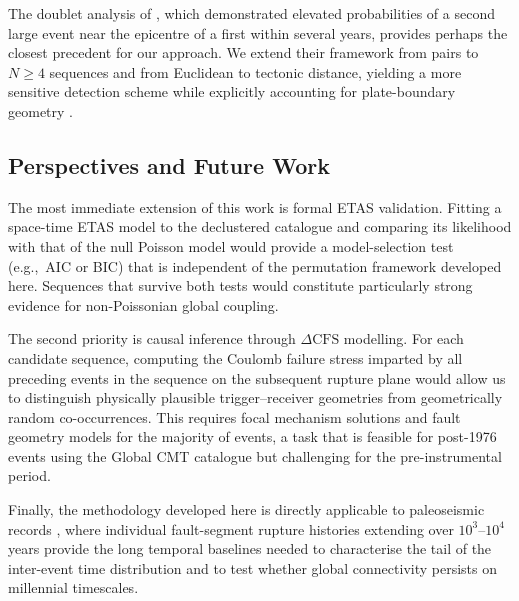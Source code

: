 The doublet analysis of \citet{KaganJackson1999}, which demonstrated
elevated probabilities of a second large event near the epicentre of a
first within several years, provides perhaps the closest precedent for
our approach.  We extend their framework from pairs to $N \geq 4$
sequences and from Euclidean to tectonic distance, yielding a more
sensitive detection scheme while explicitly accounting for plate-boundary
geometry \citep{Bird2003}.

\subsection{Perspectives and Future Work}
\label{subsec:perspectives}

The most immediate extension of this work is formal ETAS validation.
Fitting a space-time ETAS model \citep{Ogata1998, HelmstettterSornette2003}
to the declustered catalogue and comparing its likelihood with that of
the null Poisson model would provide a model-selection test
(e.g.,~AIC or BIC) that is independent of the permutation framework
developed here.  Sequences that survive both tests would constitute
particularly strong evidence for non-Poissonian global coupling.

The second priority is causal inference through $\Delta\mathrm{CFS}$
modelling.  For each candidate sequence, computing the Coulomb failure
stress imparted by all preceding events in the sequence on the subsequent
rupture plane \citep{King1994, Toda2005} would allow us to distinguish
physically plausible trigger–receiver geometries from geometrically
random co-occurrences.  This requires focal mechanism solutions and fault
geometry models for the majority of events, a task that is feasible for
post-1976 events using the Global CMT catalogue but challenging for the
pre-instrumental period.

Finally, the methodology developed here is directly applicable to
paleoseismic records \citep{McCalpin2009, Griffin2020, Giri2026}, where
individual fault-segment rupture histories extending over $10^3$–$10^4$
years provide the long temporal baselines needed to characterise the
tail of the inter-event time distribution and to test whether global
connectivity persists on millennial timescales.
